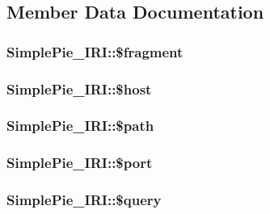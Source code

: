 \subsection{Member Data Documentation}
\hypertarget{class_simple_pie___i_r_i_ad3ef1bad21d1bd5466de18233cef8de9}{
\subsubsection[{\$fragment}]{\setlength{\rightskip}{0pt plus 5cm}Simple\-Pie\-\_\-\-I\-R\-I\-::\$fragment}}\label{class_simple_pie___i_r_i_ad3ef1bad21d1bd5466de18233cef8de9}
\hypertarget{class_simple_pie___i_r_i_aabf122f3467ec8923c53ae50c17b67c8}{
\subsubsection[{\$host}]{\setlength{\rightskip}{0pt plus 5cm}Simple\-Pie\-\_\-\-I\-R\-I\-::\$host}}\label{class_simple_pie___i_r_i_aabf122f3467ec8923c53ae50c17b67c8}
\hypertarget{class_simple_pie___i_r_i_a24be6584646497e9db5186a30a428061}{
\subsubsection[{\$path}]{\setlength{\rightskip}{0pt plus 5cm}Simple\-Pie\-\_\-\-I\-R\-I\-::\$path}}\label{class_simple_pie___i_r_i_a24be6584646497e9db5186a30a428061}
\hypertarget{class_simple_pie___i_r_i_a12d7eee2229f6eb6e7f44f4c954a4517}{
\subsubsection[{\$port}]{\setlength{\rightskip}{0pt plus 5cm}Simple\-Pie\-\_\-\-I\-R\-I\-::\$port}}\label{class_simple_pie___i_r_i_a12d7eee2229f6eb6e7f44f4c954a4517}
\hypertarget{class_simple_pie___i_r_i_ad2928b9be362591f394f3f9ecb61278c}{
\subsubsection[{\$query}]{\setlength{\rightskip}{0pt plus 5cm}Simple\-Pie\-\_\-\-I\-R\-I\-::\$query}}\label{class_simple_pie___i_r_i_ad2928b9be362591f394f3f9ecb61278c}
